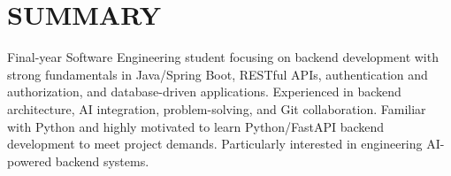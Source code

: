 \section{SUMMARY}
\noindent Final-year Software Engineering student focusing on backend development with strong fundamentals in Java/Spring Boot, RESTful APIs, authentication and authorization, and database-driven applications. Experienced in backend architecture, AI integration, problem-solving, and Git collaboration. Familiar with Python and highly motivated to learn Python/FastAPI backend development to meet project demands. Particularly interested in engineering AI-powered backend systems.

